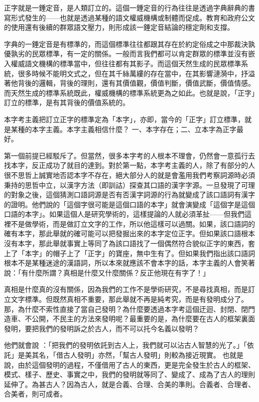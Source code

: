 \documentclass[a5paper, 10pt, openany]{book} %
\begin{document}
正字就是一錘定音，是人類訂立的。這個一錘定音的行為往往是透過字典辭典的書寫形式發生的——也就是透過某種的語文權威機構或制體而促成。教育和政府公文的使用還有後續的群眾語文壓力，則形成該一錘定音結論的穩定劑和支撐。

字典的一錘定音是有標準的，而這個標準往往都跟其存在於約定俗成之中那裁決孰優孰劣的民眾標準，有一定的關係。一般而言我們都可以肯定群眾的標準並沒有嵌入權威語文機構的標準當中，但往往都有其影子。而這個天然生成的民眾標準系統，很多時候不能明文式之，但在其千絲萬縷的存在當中，在其影響漣漪中，抒溢著他背後的邏輯，背後的理則，還有其價值觀，價值判斷，價值武斷，價值情感。而天然生成的標準系統既此，權威機構的標準系統更為之如此。也就是說，「正字」訂立的標準，是有其背後的價值系統的。 

本字考主義把訂立正字的標準定為「本字」，亦即，當今的「正字」訂立標準，就是某種的本字主義。本字主義相信什麼？ 一、本字存在；二、立本字為正字最好。

第一個前提已經駁斥了。但當然，很多本字考的人根本不理會，仍然會一意孤行去找本字，反正成功了就目的達到。對於第一點，本字考主義的人，除了有部分的人很不思哲上誠實地否認本字不存在，絕大部分人的就是會濫用我們考察詞源時必須秉持的思哲中立，以漢字方法（即訓詁）探查其口語的漢字字源。一旦發現了可理的對象之後，這個猜測口語詞源是否有否漢字詞源的行為就變成了該口語詞有漢字的證明。他們說的「這個字很可能是這個口語的本字」就會演變成「這個字是這個口語的本字」。如果這個人是研究學術的，這樣提論的人就必須革扯——但我們這裡不是做學術，而是做訂立文字的工作，所以他這樣可以過關。如果，該口語詞的確有本字，那此舉就的確可能可以把發掘出來的本字定位正字。但如果該口語根本沒有本字，那此舉就事實上等同了為該口語找了一個偶然符合貌似正字的東西，套上了「本字」的帽子上了「正字」的寶座，無中生有了。但如果我們指出該口語詞根本不是某種迷途的漢語詞，所以本來就應該不會本字的話，本字主義的人會笑著說：「有什麼所謂？真相是什麼又什麼關係？反正他現在有字了！」

真相是什麼真的沒有關係，因為我們的工作不是學術研究，不是尋找真相，而是訂立文字標準。但既然真相不重要，那此舉就不再是純考究，而是有發明成分了。那，為什麼不索性直接了當自己發明？為什麼要透過本字考這個迂迴、封閉、閉門造車、不公開，不民主的方法來發明呢？最重要的是，為什麼要在古人的框架裏面發明，要把我們的發明訴之於古人，而不可以托今名義以發明？

他們就會說 ：「把我們的發明依託到古人上，我們就可以沾古人智慧的光了。」「依託」是美其名，「借古人發明」亦然，「幫古人發明」則較為接近現實。 也就是說，由於這個發明的過程，不僅借用了古人的東西，更是完全發生於古人的框架、模式、樣子、歷史、事實之中，我們的發明就等同了、變成了、成為了古人的理則延伸了。為甚古人？因為古人，就是合義、合理、合美的準則。合義者、合理者、合美者，則可成者。
\end{document}
